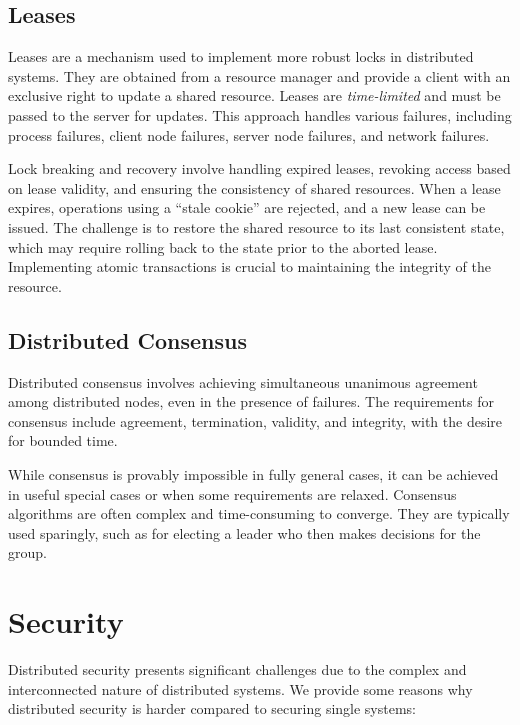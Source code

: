 \documentclass{report}
\newcommand{\corollaryBegin}[1]{\begin{tcolorbox}[colback=teal!5!white,colframe=black!75!teal,title={Corollary:
      #1}]}
\newcommand{\corollaryEnd}{\end{tcolorbox}}
\begin{document}
\subsection{Leases}
Leases are a mechanism used to implement more robust locks in distributed systems. They are obtained
from a resource manager and provide a client with an exclusive right to update a shared
resource. Leases are \textit{time-limited} and must be passed to the server for updates. This approach
handles various failures, including process failures, client node failures, server node failures,
and network failures. 


\corollaryBegin{Lock Breaking and Recovery}
Lock breaking and recovery involve handling expired leases, revoking access based on lease validity,
and ensuring the consistency of shared resources. When a lease expires, operations using a ``stale
cookie'' are rejected, and a new lease can be issued. The challenge is to restore the shared
resource to its last consistent state, which may require rolling back to the state prior to the
aborted lease. Implementing atomic transactions is crucial to maintaining the integrity of the
resource.
\corollaryEnd


\subsection{Distributed Consensus}
Distributed consensus involves achieving simultaneous unanimous agreement among distributed nodes,
even in the presence of failures. The requirements for consensus include agreement, termination,
validity, and integrity, with the desire for bounded time.

While consensus is provably impossible in fully general cases, it can be achieved in useful special
cases or when some requirements are relaxed. Consensus algorithms are often complex and
time-consuming to converge. They are typically used sparingly, such as for electing a leader who
then makes decisions for the group.





\section{Security}
Distributed security presents significant challenges due to the complex and interconnected nature of
distributed systems. We provide some reasons why distributed security is harder compared to securing
single systems:
\end{document}
